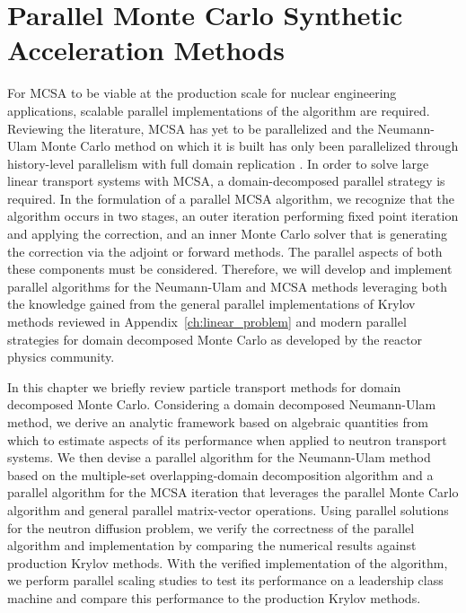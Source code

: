 \chapter{Parallel Monte Carlo Synthetic \\ Acceleration Methods\ }
\label{ch:parallel_methods}
For MCSA to be viable at the production scale for nuclear engineering
applications, scalable parallel implementations of the algorithm are
required. Reviewing the literature, MCSA has yet to be parallelized
and the Neumann-Ulam Monte Carlo method on which it is built has only
been parallelized through history-level parallelism with full domain
replication \citep{alexandrov_efficient_1998}. In order to solve large
linear transport systems with MCSA, a domain-decomposed parallel
strategy is required. In the formulation of a parallel MCSA algorithm,
we recognize that the algorithm occurs in two stages, an outer
iteration performing fixed point iteration and applying the
correction, and an inner Monte Carlo solver that is generating the
correction via the adjoint or forward methods. The parallel aspects of
both these components must be considered. Therefore, we will develop
and implement parallel algorithms for the Neumann-Ulam and MCSA
methods leveraging both the knowledge gained from the general parallel
implementations of Krylov methods reviewed in
Appendix~\ref{ch:linear_problem} and modern parallel strategies for
domain decomposed Monte Carlo as developed by the reactor physics
community.

In this chapter we briefly review particle transport methods for
domain decomposed Monte Carlo. Considering a domain decomposed
Neumann-Ulam method, we derive an analytic framework based on
algebraic quantities from which to estimate aspects of its performance
when applied to neutron transport systems. We then devise a parallel
algorithm for the Neumann-Ulam method based on the multiple-set
overlapping-domain decomposition algorithm and a parallel algorithm
for the MCSA iteration that leverages the parallel Monte Carlo
algorithm and general parallel matrix-vector operations. Using
parallel solutions for the neutron diffusion problem, we verify the
correctness of the parallel algorithm and implementation by comparing
the numerical results against production Krylov methods. With the
verified implementation of the algorithm, we perform parallel scaling
studies to test its performance on a leadership class machine and
compare this performance to the production Krylov methods.

